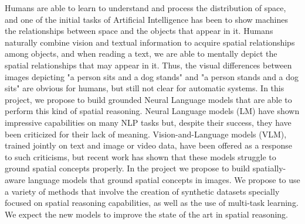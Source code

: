 Humans are able to learn to understand and process the distribution of space, and one of the initial tasks of Artificial Intelligence has been to show machines the relationships between space and the objects that appear in it. Humans naturally combine vision and textual information to acquire spatial relationships among objects, and when reading a text, we are able to mentally depict the spatial relationships that may appear in it. Thus, the visual differences between images depicting "a person sits and a dog stands" and "a person stands and a dog sits" are obvious for humans, but still not clear for automatic systems. In this project, we propose to build grounded Neural Language models that are able to perform this kind of spatial reasoning. Neural Language models (LM) have shown impressive capabilities on many NLP tasks but, despite their success, they have been criticized for their lack of meaning. Vision-and-Language models (VLM), trained jointly on text and image or video data, have been offered as a response to such criticisms, but recent work has shown that these models struggle to ground spatial concepts properly. In the project we propose to build spatially-aware language models that ground spatial concepts in images. We propose to use a variety of methods that involve the creation of synthetic datasets specially focused on spatial reasoning capabilities, as well as the use of multi-task learning. We expect the new models to improve the state of the art in spatial reasoning.